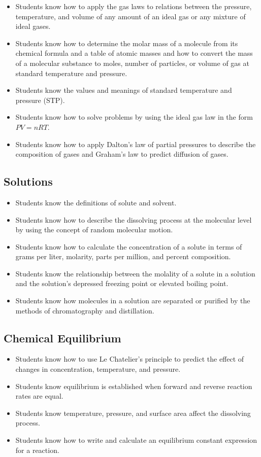 \documentclass[12pt]{article}
\begin{document}
\begin{itemize}
    \item Students know how to apply the gas laws to relations between the pressure, temperature, and volume of any amount of an ideal gas or any mixture of ideal gases.
    \item Students know how to determine the molar mass of a molecule from its chemical formula and a table of atomic masses and how to convert the mass of a molecular substance to moles, number of particles, or volume of gas at standard temperature and pressure.
    \item Students know the values and meanings of standard temperature and pressure (STP).
    \item Students know how to solve problems by using the ideal gas law in the form $PV = nRT$.
    \item Students know how to apply Dalton's law of partial pressures to describe the composition of gases and Graham's law to predict diffusion of gases.
\end{itemize}

\subsection{Solutions}

\begin{itemize}
    \item Students know the definitions of solute and solvent.
    \item Students know how to describe the dissolving process at the molecular level by using the concept of random molecular motion.
    \item Students know how to calculate the concentration of a solute in terms of grams per liter, molarity, parts per million, and percent composition.
    \item Students know the relationship between the molality of a solute in a solution and the solution's depressed freezing point or elevated boiling point.
    \item Students know how molecules in a solution are separated or purified by the methods of chromatography and distillation.
\end{itemize}

\subsection{Chemical Equilibrium}

\begin{itemize}
    \item Students know how to use Le Chatelier's principle to predict the effect of changes in concentration, temperature, and pressure.
    \item Students know equilibrium is established when forward and reverse reaction rates are equal.
    \item Students know temperature, pressure, and surface area affect the dissolving process.
    \item Students know how to write and calculate an equilibrium constant expression for a reaction.
\end{itemize}
\end{document}
